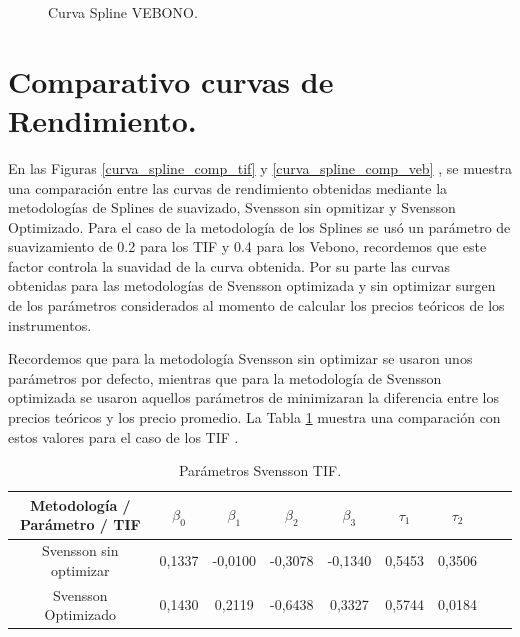 \begin{figure}[h]
\caption{Curva Spline VEBONO.}
\label{curva_spline_veb}
\end{figure}

\newpage

\section{Comparativo curvas de Rendimiento.}

\hspace{0.4cm} En las Figuras \ref{curva_spline_comp_tif} y \ref{curva_spline_comp_veb} , se muestra una comparaci\'on entre las curvas de rendimiento obtenidas mediante la metodolog\'ias de Splines de suavizado, Svensson sin opmitizar y Svensson Optimizado.
Para el caso de la metodolog\'ia de los Splines se us\'o un par\'ametro de suavizamiento de 0.2 para los TIF y 0.4 para los Vebono, recordemos que este factor controla la suavidad de la curva obtenida. Por su parte las curvas obtenidas para las metodolog\'ias de Svensson optimizada y sin optimizar surgen de los par\'ametros considerados al momento de calcular los precios te\'oricos de los instrumentos.

\hspace{0.4cm}Recordemos que para la metodolog\'ia Svensson sin optimizar se usaron unos par\'ametros por defecto, mientras que para la metodolog\'ia de Svensson optimizada se usaron aquellos par\'ametros de minimizaran la diferencia entre los precios te\'oricos y los precio promedio. La Tabla \ref{tabla4} muestra una comparaci\'on con estos valores para el caso de los TIF .

\begin{table}[H]
\centering
{\begin{tabular}[t]{|c |c |c |c |c |c |c |c |r|}
\hline
Metodolog\'ia / Par\'ametro / TIF & $\beta_{0}$ & $\beta_{1}$ & $\beta_{2}$ & $\beta_{3}$  &  $\tau_{1}$ & $\tau_{2}$ \\
\hline
Svensson sin optimizar & 0,1337 & -0,0100 & -0,3078 & -0,1340  & 0,5453 & 0,3506\\
\hline
Svensson Optimizado & 0,1430 & 0,2119 & -0,6438 & 0,3327 & 0,5744 & 0,0184 \\
\hline
\end{tabular}}
\caption{Par\'ametros Svensson TIF.}
\label{tabla4}
\end{table}


